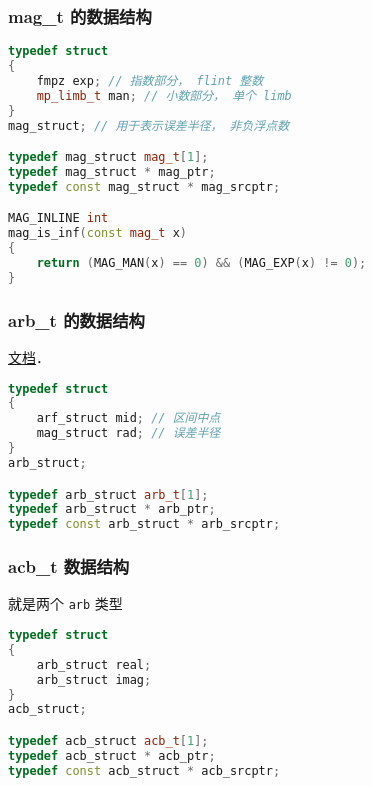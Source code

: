 \subsubsection{mag_t 的数据结构}
\begin{lstlisting}[language=cpp]
typedef struct
{
    fmpz exp; // 指数部分， flint 整数
    mp_limb_t man; // 小数部分， 单个 limb
}
mag_struct; // 用于表示误差半径， 非负浮点数

typedef mag_struct mag_t[1];
typedef mag_struct * mag_ptr;
typedef const mag_struct * mag_srcptr;

MAG_INLINE int
mag_is_inf(const mag_t x)
{
    return (MAG_MAN(x) == 0) && (MAG_EXP(x) != 0);
}
\end{lstlisting}

\subsubsection{arb_t 的数据结构}
\href{https://arblib.org/arb.html}{文档}．

\begin{lstlisting}[language=cpp]
typedef struct
{
    arf_struct mid; // 区间中点
    mag_struct rad; // 误差半径
}
arb_struct;

typedef arb_struct arb_t[1];
typedef arb_struct * arb_ptr;
typedef const arb_struct * arb_srcptr;
\end{lstlisting}

\subsubsection{acb_t 数据结构}
就是两个 \verb|arb| 类型
\begin{lstlisting}[language=cpp]
typedef struct
{
    arb_struct real;
    arb_struct imag;
}
acb_struct;

typedef acb_struct acb_t[1];
typedef acb_struct * acb_ptr;
typedef const acb_struct * acb_srcptr;
\end{lstlisting}
